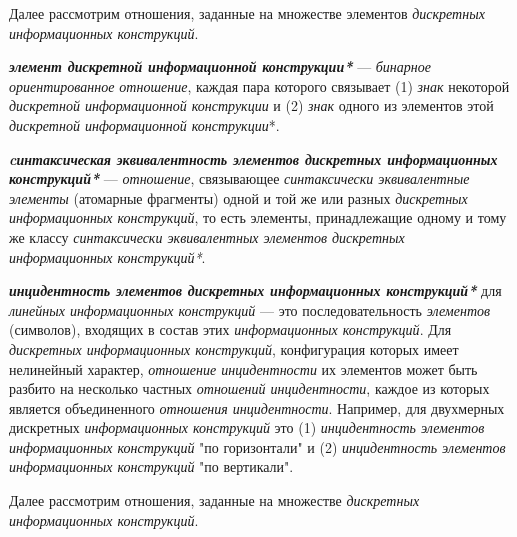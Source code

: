 Далее рассмотрим отношения, заданные на множестве элементов \textit{дискретных информационных конструкций}.

\begin{SCn}


\end{SCn}

\textbf{\textit{элемент дискретной информационной конструкции*}} --- \textit{бинарное ориентированное отношение}, каждая пара которого связывает (1) \textit{знак} некоторой \textit{дискретной информационной конструкции} и (2) \textit{знак} одного из элементов этой \textit{дискретной информационной конструкции}*.

\textbf{\textit{cинтаксическая эквивалентность элементов дискретных информационных конструкций*}} --- \textit{отношение}, связывающее \textit{синтаксически эквивалентные элементы} (атомарные фрагменты) одной и той же или разных \textit{дискретных информационных конструкций}, то есть элементы, принадлежащие одному и тому же классу \textit{синтаксически эквивалентных элементов дискретных информационных конструкций*}.

\textbf{\textit{инцидентность элементов дискретных информационных конструкций*}} для \textit{линейных информационных конструкций} --- это последовательность \textit{элементов} (символов), входящих в состав этих \textit{информационных конструкций}.
Для \textit{дискретных информационных конструкций}, конфигурация которых имеет нелинейный характер, \textit{отношение инцидентности} их элементов может быть разбито на несколько частных \textit{отношений инцидентности}, каждое из которых является  объединенного \textit{отношения инцидентности}.
Например, для двухмерных дискретных \textit{информационных конструкций} это (1) \textit{инцидентность элементов информационных конструкций} "по горизонтали"{} и (2) \textit{инцидентность элементов информационных конструкций} "по вертикали"{}.

Далее рассмотрим отношения, заданные на множестве \textit{дискретных информационных конструкций}.

